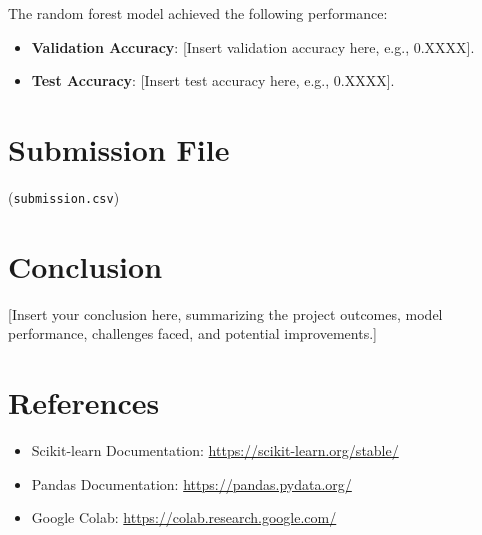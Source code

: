 \documentclass[12pt, a4paper]{article}
\begin{document}
The random forest model achieved the following performance:

\begin{itemize}
    \item \textbf{Validation Accuracy}: [Insert validation accuracy here, e.g., 0.XXXX].
    \item \textbf{Test Accuracy}: [Insert test accuracy here, e.g., 0.XXXX].
\end{itemize}

\section{Submission File}
(\texttt{submission.csv})

\section{Conclusion}
[Insert your conclusion here, summarizing the project outcomes, model performance, challenges faced, and potential improvements.]

\section{References}
\begin{itemize}
    \item Scikit-learn Documentation: \url{https://scikit-learn.org/stable/}
    \item Pandas Documentation: \url{https://pandas.pydata.org/}
    \item Google Colab: \url{https://colab.research.google.com/}
\end{itemize}
\end{document}
